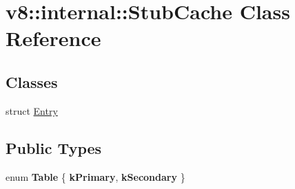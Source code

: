 \hypertarget{classv8_1_1internal_1_1_stub_cache}{}\section{v8\+:\+:internal\+:\+:Stub\+Cache Class Reference}
\label{classv8_1_1internal_1_1_stub_cache}
\subsection*{Classes}
\begin{DoxyCompactItemize}
\item 
struct \hyperlink{structv8_1_1internal_1_1_stub_cache_1_1_entry}{Entry}
\end{DoxyCompactItemize}
\subsection*{Public Types}
\begin{DoxyCompactItemize}
\item 
\hypertarget{classv8_1_1internal_1_1_stub_cache_ab15c79e4f18b5d3fbc4ede4c256f35fb}{}enum {\bfseries Table} \{ {\bfseries k\+Primary}, 
{\bfseries k\+Secondary}
 \}\label{classv8_1_1internal_1_1_stub_cache_ab15c79e4f18b5d3fbc4ede4c256f35fb}

\end{DoxyCompactItemize}
